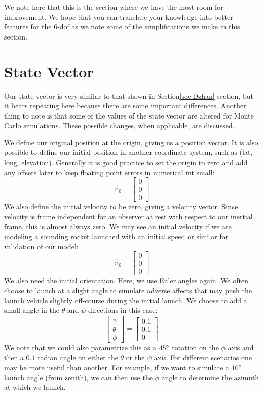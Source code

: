 \documentclass[12pt]{report}
\begin{document}
We note here that this is the section where we have the most room for improvement. We hope that you can translate your knowledge into better features for the 6-\gls{dof} as we note some of the simplifications we make in this section.

\section{State Vector}
Our \gls{state vector} is very similar to that shown in Section\ref{sec:Dzhan} section, but it bears repeating here because there are some important differences. Another thing to note is that some of the values of the \gls{state vector} are altered for Monte Carlo simulations. These possible changes, when applicable, are discussed.

We define our original position at the origin, giving us a position vector. It is also possible to define our initial position in another coordinate system, such as (lat, long, elevation). Generally it is good practice to set the origin to zero and add any offsets later to keep floating point errors in \gls{numerical int} small:
$$\vec{r}_0=\begin{bmatrix}
    0\\0\\0
\end{bmatrix}$$
We also define the initial velocity to be zero, giving a velocity vector. Since velocity is frame independent for an observer at rest with respect to our \gls{inertial frame}, this is almost always zero. We may see an initial velocity if we are modeling a sounding rocket launched with an initial speed or similar for validation of our model:
$$\vec{v}_0=\begin{bmatrix}
    0\\0\\0
\end{bmatrix}$$
We also need the initial orientation. Here, we use \gls{Euler angles} again. We often choose to launch at a slight angle to simulate adverse affects that may push the launch vehicle slightly off-course during the initial launch. We choose to add a small angle in the $\theta$ and $\psi$ directions in this case:
\begin{equation}\label{eq: euler angles 6DoF}
    \begin{bmatrix}
    \psi\\\theta\\\phi
\end{bmatrix} =
\begin{bmatrix}
    0.1\\0.1\\0
\end{bmatrix}
\end{equation}
We note that we could also parametrize this as a $45\degree$ rotation on the $\phi$ axis and then a $0.1$ radian angle on either the $\theta$ or the $\psi$ axis. For different scenarios one may be more useful than another. For example, if we want to simulate a $10\degree$ launch angle (from zenith), we can then use the $\phi$ angle to determine the azimuth at which we launch.
\end{document}
